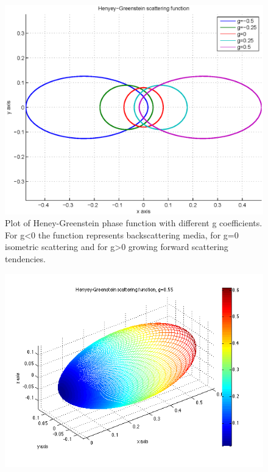 \label{lab:HEN}
\begin{minipage}{\linewidth}
      \begin{minipage}{0.45\linewidth}
          \begin{figure}[H]
              \includegraphics[width=\linewidth]{02_Chap2/Figures/heneygreenstein2dgraph}
              \captionsetup{width=\linewidth}
              \caption[2D plot of Plot of Heney-Greenstein phase function.]{Plot of Heney-Greenstein phase function with different g coefficients. For g\textless0 the function represents backscattering media, for g=0 isometric scattering and for g\textgreater0 growing forward scattering tendencies.}\label{fig:HG2}
          \end{figure}
      \end{minipage}
      \hspace{0.05\linewidth}
      \begin{minipage}{0.45\linewidth}
          \begin{figure}[H]
              \includegraphics[width=\linewidth]{images/hg3d}

\end{figure}
\end{minipage}
\end{minipage}
